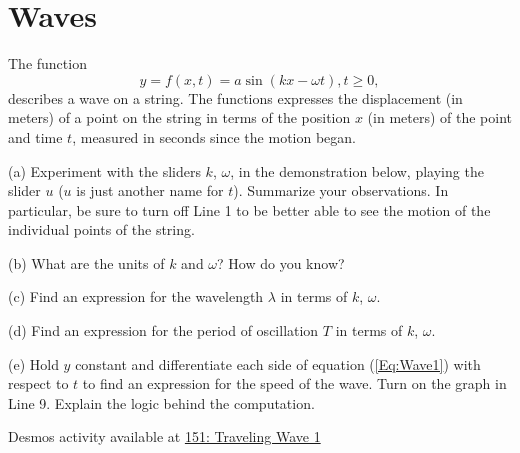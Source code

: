 \documentclass{ximera}
\begin{document}
\section*{Waves}

\begin{question}   \label{Q:DFLDFDFGggg}
The function
\begin{equation}  \label{Eq:Wave1}
      y= f(x,t) = a \sin (kx - \omega t) , t\geq 0,
\end{equation}
describes a wave on a string. The functions expresses the displacement (in meters) of a point on the string in terms of the position $x$ (in meters) of the point and time $t$, measured in seconds since the motion began.

(a) Experiment with the sliders $k$, $\omega$, in the demonstration below, playing the slider $u$ ($u$ is just another name for $t$). Summarize your observations. In particular, be sure to turn off Line 1 to be better able to see the motion of the individual points of the string.

(b) What are the units of $k$ and $\omega$? How do you know?

(c) Find an expression for the wavelength $\lambda$ in terms of $k$, $\omega$.

(d) Find an expression for the period of oscillation $T$ in terms of $k$, $\omega$.
 
(e) Hold $y$ constant and differentiate each side of equation (\ref{Eq:Wave1}) with respect to $t$ to find an expression for the speed of the wave. Turn on the graph in Line 9. Explain the logic behind the computation. 

\begin{onlineOnly}
    \begin{center}
\end{center}
\end{onlineOnly}

Desmos activity available at \href{https://www.desmos.com/calculator/9xmkig9hwi}{151: Traveling Wave 1}

\end{question}
\end{document}
